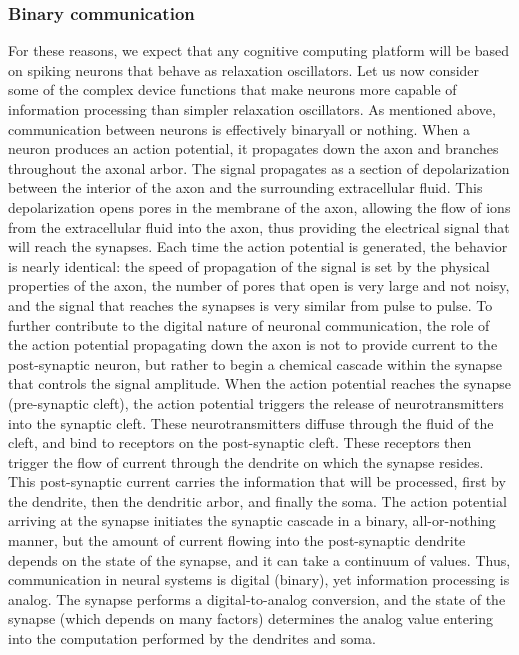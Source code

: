 \documentclass[twocolumn]{article}
\begin{document}
\subsubsection{Binary communication}
For these reasons, we expect that any cognitive computing platform will be based on spiking neurons that behave as relaxation oscillators. Let us now consider some of the complex device functions that make neurons more capable of information processing than simpler relaxation oscillators. As mentioned above, communication between neurons is effectively binary\textemdash all or nothing. When a neuron produces an action potential, it propagates down the axon and branches throughout the axonal arbor. The signal propagates as a section of depolarization between the interior of the axon and the surrounding extracellular fluid. This depolarization opens pores in the membrane of the axon, allowing the flow of ions from the extracellular fluid into the axon, thus providing the electrical signal that will reach the synapses. Each time the action potential is generated, the behavior is nearly identical: the speed of propagation of the signal is set by the physical properties of the axon, the number of pores that open is very large and not noisy, and the signal that reaches the synapses is very similar from pulse to pulse. To further contribute to the digital nature of neuronal communication, the role of the action potential propagating down the axon is not to provide current to the post-synaptic neuron, but rather to begin a chemical cascade within the synapse that controls the signal amplitude. When the action potential reaches the synapse (pre-synaptic cleft), the action potential triggers the release of neurotransmitters into the synaptic cleft. These neurotransmitters diffuse through the fluid of the cleft, and bind to receptors on the post-synaptic cleft. These receptors then trigger the flow of current through the dendrite on which the synapse resides. This post-synaptic current carries the information that will be processed, first by the dendrite, then the dendritic arbor, and finally the soma. The action potential arriving at the synapse initiates the synaptic cascade in a binary, all-or-nothing manner, but the amount of current flowing into the post-synaptic dendrite depends on the state of the synapse, and it can take a continuum of values. Thus, communication in neural systems is digital (binary), yet information processing is analog. The synapse performs a digital-to-analog conversion, and the state of the synapse (which depends on many factors) determines the analog value entering into the computation performed by the dendrites and soma. 
\end{document}
